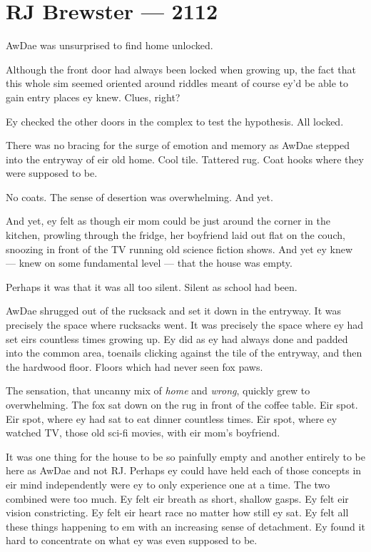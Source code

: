 \hypertarget{rj-brewster-2112}{%
\chapter*{RJ Brewster — 2112}\label{rj-brewster-2112}}

AwDae was unsurprised to find home unlocked.

Although the front door had always been locked when growing up, the fact that this whole sim seemed oriented around riddles meant of course ey'd be able to gain entry places ey knew. Clues, right?

Ey checked the other doors in the complex to test the hypothesis. All locked.

There was no bracing for the surge of emotion and memory as AwDae stepped into the entryway of eir old home. Cool tile. Tattered rug. Coat hooks where they were supposed to be.

No coats. The sense of desertion was overwhelming. And yet.

And yet, ey felt as though eir mom could be just around the corner in the kitchen, prowling through the fridge, her boyfriend laid out flat on the couch, snoozing in front of the TV running old science fiction shows. And yet ey knew — knew on some fundamental level — that the house was empty.

Perhaps it was that it was all too silent. Silent as school had been.

AwDae shrugged out of the rucksack and set it down in the entryway. It was precisely the space where rucksacks went. It was precisely the space where ey had set eirs countless times growing up. Ey did as ey had always done and padded into the common area, toenails clicking against the tile of the entryway, and then the hardwood floor. Floors which had never seen fox paws.

The sensation, that uncanny mix of \emph{home} and \emph{wrong}, quickly grew to overwhelming. The fox sat down on the rug in front of the coffee table. Eir spot. Eir spot, where ey had sat to eat dinner countless times. Eir spot, where ey watched TV, those old sci-fi movies, with eir mom's boyfriend.

It was one thing for the house to be so painfully empty and another entirely to be here as AwDae and not RJ. Perhaps ey could have held each of those concepts in eir mind independently were ey to only experience one at a time. The two combined were too much. Ey felt eir breath as short, shallow gasps. Ey felt eir vision constricting. Ey felt eir heart race no matter how still ey sat. Ey felt all these things happening to em with an increasing sense of detachment. Ey found it hard to concentrate on what ey was even supposed to be.

